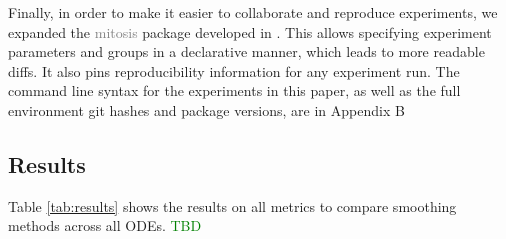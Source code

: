 \documentclass{article}
\newcommand{\gray}[1]{\textcolor{gray}{#1}}
\newcommand{\green}[1]{\textcolor{green}{#1}}
\begin{document}
Finally, in order to make it easier to collaborate and reproduce experiments, we expanded the \gray{mitosis} package developed in \cite{Stevens-Haas2022}.  This allows specifying experiment parameters and groups in a declarative manner, which leads to more readable diffs.  It also pins reproducibility information for any experiment run.  The command line syntax for the experiments in this paper, as well as the full environment git hashes and package versions, are in Appendix B

\subsection{Results}

Table \ref{tab:results} shows the results on all metrics to compare smoothing methods across all ODEs. \green{TBD}

\begin{table}
    \label{tab:results}
\end{table}
\end{document}
